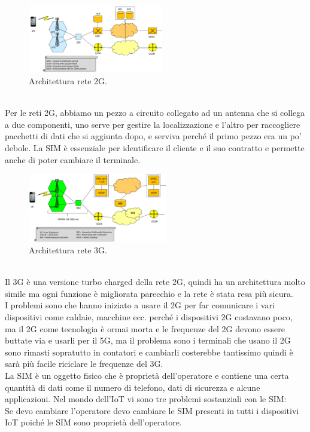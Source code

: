 \documentclass[11pt, twocolumn]{article}
\begin{document}
\begin{figure}[!h]
  \centering
  \includegraphics[width=\linewidth,height=3cm]{imgs/2g.png}
  \caption{Architettura rete 2G.}
  \label{fig:2g}
\end{figure}\\
Per le reti 2G, abbiamo un pezzo a circuito collegato ad un antenna che si collega a due componenti, uno serve per gestire la localizzazione e l'altro per raccogliere pacchetti di dati che si aggiunta dopo, e serviva perché il primo pezzo era un po' debole.
La SIM è essenziale per identificare il cliente e il suo contratto e permette anche di poter cambiare il terminale.
\begin{figure}[!h]
  \centering
  \includegraphics[width=\linewidth,height=3cm]{imgs/3g.png}
  \caption{Architettura rete 3G.}
  \label{fig:3g}
\end{figure}\\
Il 3G è una versione turbo charged della rete 2G, quindi ha un architettura molto simile ma ogni funzione è migliorata parecchio e la rete è stata resa più sicura.\\
I problemi sono che hanno iniziato a usare il 2G per far comunicare i vari dispositivi come caldaie, macchine ecc. perché i dispositivi 2G costavano poco, ma il 2G come tecnologia è ormai morta e le frequenze del 2G devono essere buttate via e usarli per il 5G, ma il problema sono i terminali che usano il 2G sono rimasti sopratutto in contatori e cambiarli costerebbe tantissimo quindi è sarà più facile riciclare le frequenze del 3G.\\
La SIM è un oggetto fisico che è proprietà dell'operatore e contiene una certa quantità di dati come il numero di telefono, dati di sicurezza e alcune applicazioni.
Nel mondo dell'IoT vi sono tre problemi sostanziali con le SIM:\\
Se devo cambiare l'operatore devo cambiare le SIM presenti in tutti i dispositivi IoT poiché le SIM sono proprietà dell'operatore.\\
\end{document}

